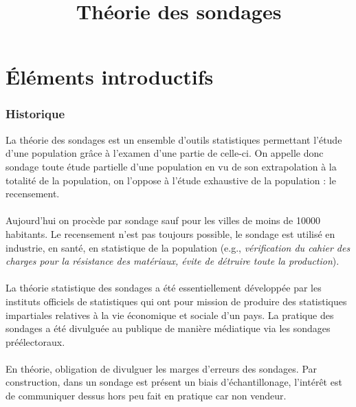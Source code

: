 \documentclass{article}
\title{Théorie des sondages}
\author{}
\date{}
\begin{document}
\maketitle
\tableofcontents
\newpage
\part*{Éléments introductifs}
\section{Historique}
La théorie des sondages est un ensemble d'outils statistiques permettant l'étude d'une population grâce à l'examen d'une partie de celle-ci. On appelle donc sondage toute étude partielle d'une population en vu de son extrapolation à la totalité de la population, on l'oppose à l'étude exhaustive de la population : le recensement. \\ \\
Aujourd'hui on procède par sondage sauf pour les villes de moins de 10000 habitants. Le recensement n'est pas toujours possible, le sondage est utilisé en industrie, en santé, en statistique de la population (e.g., \textit{vérification du cahier des charges pour la résistance des matériaux, évite de détruire toute la production}). \\ \\
La théorie statistique des sondages a été essentiellement développée par les instituts officiels de statistiques qui ont pour mission de produire des statistiques impartiales relatives à la vie économique et sociale d'un pays. La pratique des sondages a été divulguée au publique de manière médiatique via les sondages préélectoraux. \\ \\ 
En théorie, obligation de divulguer les marges d'erreurs des sondages. Par construction, dans un sondage est présent un biais d'échantillonage, l'intérêt est de communiquer dessus hors peu fait en pratique car non vendeur.
\end{document}
